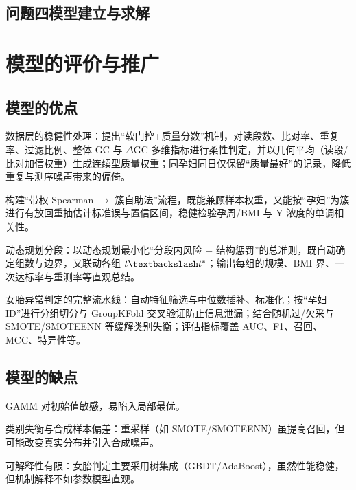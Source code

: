 \documentclass[utf8,12pt]{ctexart}
\begin{document}
    \subsection{问题四模型建立与求解}
    
\newpage
    {\centering\section{模型的评价与推广}}

\subsection{模型的优点}
\begin{compactitem}
    \item 数据层的稳健性处理：提出“软门控+质量分数”机制，对读段数、比对率、重复率、过滤比例、整体 GC 与 $\Delta$GC 多维指标进行柔性判定，并以几何平均（读段/比对加信权重）生成连续型质量权重；同孕妇同日仅保留“质量最好”的记录，降低重复与测序噪声带来的偏倚。
    \item 构建“带权 Spearman $\to$ 簇自助法”流程，既能兼顾样本权重，又能按“孕妇”为簇进行有放回重抽估计标准误与置信区间，稳健检验孕周/BMI 与 Y 浓度的单调相关性。
    \item 动态规划分段：以动态规划最小化“分段内风险 + 结构惩罚”的总准则，既自动确定组数与边界，又联动各组 $t \textbackslash t^*$；输出每组的规模、BMI 界、一次达标率与重测率等直观总结。
    \item 女胎异常判定的完整流水线：自动特征筛选与中位数插补、标准化；按“孕妇 ID”进行分组切分与 GroupKFold 交叉验证防止信息泄漏；结合随机过/欠采与 SMOTE/SMOTEENN 等缓解类别失衡；评估指标覆盖 AUC、F1、召回、MCC、特异性等。
\end{compactitem}

\subsection{模型的缺点}
\begin{compactitem}
    \item GAMM 对初始值敏感，易陷入局部最优。
    \item 类别失衡与合成样本偏差：重采样（如 SMOTE/SMOTEENN）虽提高召回，但可能改变真实分布并引入合成噪声。
    \item 可解释性有限：女胎判定主要采用树集成（GBDT/AdaBoost），虽然性能稳健，但机制解释不如参数模型直观。
\end{compactitem}
\end{document}
